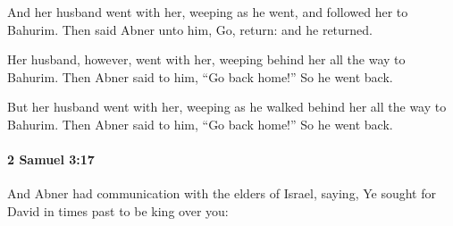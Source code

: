 			\begin{versebox}
					\item[BHS] 
					\item[ASV] And her husband went with her, weeping as he went, and followed her to Bahurim. Then said Abner unto him, Go, return: and he returned.
					\item[NIV] Her husband, however, went with her, weeping behind her all the way to Bahurim. Then Abner said to him, “Go back home!” So he went back.
					\item[NRSV] But her husband went with her, weeping as he walked behind her all the way to Bahurim. Then Abner said to him, “Go back home!” So he went back.
			\end{versebox}

		\paragraph{2 Samuel 3:17} %
			\label{2SAMUEL-3-17}

			And Abner had communication with the elders of Israel, saying, Ye sought for David in times past to be king over you:

